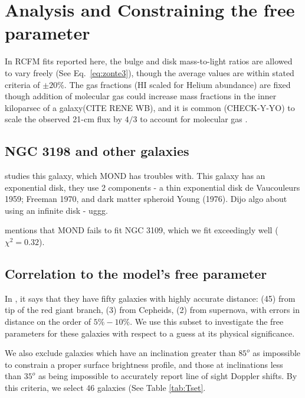 \documentclass[reprint,%
 amsmath,amssymb,
 aps,
]{revtex4-1}
\begin{document}
  
 
\section{Analysis and Constraining the free parameter \label{sec:analysis}}


In RCFM fits reported here, the    bulge and disk mass-to-light ratios are allowed to vary freely (See Eq.~\ref{eq:zonte3}), though the average values are within stated criteria   \cite{2016Lelli} of $\pm 20\%$. The gas fractions (HI scaled for Helium abundance) are fixed though addition of molecular gas could increase mass fractions in the inner kiloparsec of a galaxy(CITE RENE WB), and it is common (CHECK-Y-YO) to scale the observed 21-cm flux by $4/3$ to account for molecular gas \cite{2004ApJ...609..652M}.


\subsection{NGC 3198 and other galaxies}
\cite{1985ApJAlbada} studies this galaxy, which MOND has troubles with. This galaxy has an exponential disk, they use 2 components -  a thin exponential disk de Vaucouleurs 1959;
Freeman 1970, and dark matter spheroid Young (1976). Dijo algo about using an infinite disk - uggg. 
 
\cite{Toky} mentions that MOND fails to fit NGC 3109, which we fit exceedingly well ($\chi^2 = 0.32$).
\subsection{Correlation to  the model's free parameter }


 In \cite{2016Lelli}, it says that they have fifty  galaxies with highly accurate distance: (45) from tip of the red giant branch, (3) from Cepheids, (2) from supernova, with errors in distance on the order of $5\% - 10\%$. We use this subset to investigate   the free parameters for these galaxies with respect to a guess at its physical significance. 
 
 
We also exclude galaxies  which have an inclination greater than $85^o$ as impossible to constrain a proper surface brightness profile, and those at inclinations less than $35^o$ as being impossible to accurately report line of sight Doppler shifts.   
  By this criteria, we select 46 galaxies (See Table \ref{tab:Tset}. 
  
\end{document}
